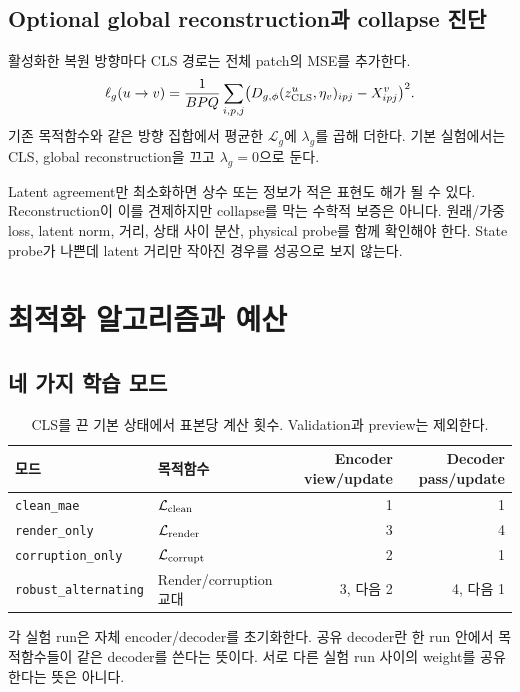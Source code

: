 \documentclass[11pt,a4paper]{article}
\newcommand{\code}[1]{\nolinkurl{#1}}
\newcommand{\Lc}{\mathcal{L}}
\begin{document}
\subsection{Optional global reconstruction과 collapse 진단}
활성화한 복원 방향마다 CLS 경로는 전체 patch의 MSE를 추가한다.
\begin{equation}
\ell_g(u\to v)=\frac{1}{BPQ}\sum_{i,p,j}
\bigl(D_{g,\phi}(z^u_{\rm CLS},\eta_v)_{ipj}-X^v_{ipj}\bigr)^2.
\end{equation}
기존 목적함수와 같은 방향 집합에서 평균한 $\Lc_g$에 $\lambda_g$를 곱해 더한다.
기본 실험에서는 CLS, global reconstruction을 끄고 $\lambda_g=0$으로 둔다.

Latent agreement만 최소화하면 상수 또는 정보가 적은 표현도 해가 될 수 있다.
Reconstruction이 이를 견제하지만 collapse를 막는 수학적 보증은 아니다.
원래/가중 loss, latent norm, 거리, 상태 사이 분산, physical probe를 함께
확인해야 한다. State probe가 나쁜데 latent 거리만 작아진 경우를 성공으로 보지 않는다.

\section{최적화 알고리즘과 예산}
\subsection{네 가지 학습 모드}
\begin{table}[htbp]\centering\small
\begin{tabularx}{\linewidth}{lXrr}
\toprule 모드 & 목적함수 & Encoder view/update & Decoder pass/update \\\midrule
\code{clean_mae} & $\Lc_{\rm clean}$ & 1 & 1 \\
\code{render_only} & $\Lc_{\rm render}$ & 3 & 4 \\
\code{corruption_only} & $\Lc_{\rm corrupt}$ & 2 & 1 \\
\code{robust_alternating} & Render/corruption 교대 & 3, 다음 2 & 4, 다음 1 \\\bottomrule
\end{tabularx}
\caption{CLS를 끈 기본 상태에서 표본당 계산 횟수. Validation과 preview는 제외한다.}
\end{table}
각 실험 run은 자체 encoder/decoder를 초기화한다. 공유 decoder란 한 run 안에서
목적함수들이 같은 decoder를 쓴다는 뜻이다. 서로 다른 실험 run 사이의 weight를
공유한다는 뜻은 아니다.
\end{document}
